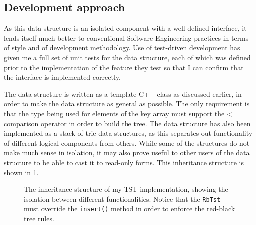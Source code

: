 \documentclass[a4paper,12pt,twoside,openright]{report}
\begin{document}
	\subsection{Development approach}
	
	As this data structure is an isolated component with a well-defined interface, it lends itself much better to conventional Software Engineering practices in terms of style and of development methodology. Use of test-driven development has given me a full set of unit tests for the data structure, each of which was defined prior to the implementation of the feature they test so that I can confirm that the interface is implemented correctly.
	
	The data structure is written as a template C++ class as discussed earlier, in order to make the data structure as general as possible. The only requirement is that the type being used for elements of the key array must support the < comparison operator in order to build the tree. The data structure has also been implemented as a stack of trie data structures, as this separates out functionality of different logical components from others. While some of the structures do not make much sense in isolation, it may also prove useful to other users of the data structure to be able to cast it to read-only forms. This inheritance structure is shown in \figurename{ \ref{fig:RbtTrie-inheritance}}.
	
	\begin{figure}
		\centering
		\caption{The inheritance structure of my TST implementation, showing the isolation between different functionalities. Notice that the \texttt{RbTst} must override the \texttt{insert()} method in order to enforce the red-black tree rules.}
		\label{fig:RbtTrie-inheritance}
	\end{figure}
	
\end{document}
